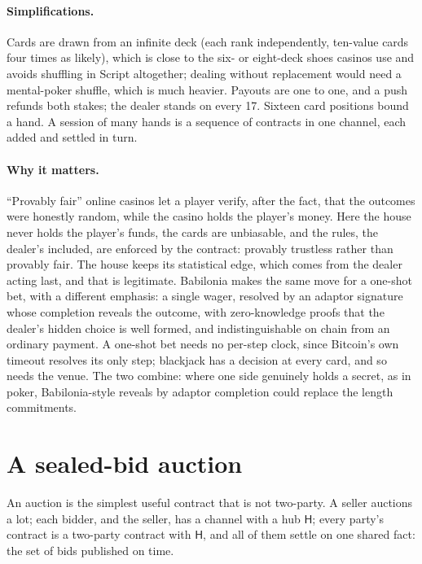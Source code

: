\documentclass[11pt]{article}
\newcommand{\Hub}{\mathsf{H}}
\begin{document}
\paragraph{Simplifications.} Cards are drawn from an infinite deck (each
rank independently, ten-value cards four times as likely), which is close
to the six- or eight-deck shoes casinos use and avoids shuffling in
Script altogether; dealing without replacement would need a mental-poker
shuffle, which is much heavier. Payouts are one to one, and a push
refunds both stakes; the dealer stands on every 17. Sixteen card
positions bound a hand. A session of many hands is a sequence of
contracts in one channel, each added and settled in turn.

\paragraph{Why it matters.} ``Provably fair'' online casinos let a
player verify, after the fact, that the outcomes were honestly random,
while the casino holds the player's money. Here the house never holds
the player's funds, the cards are unbiasable, and the rules, the
dealer's included, are enforced by the contract: provably trustless
rather than provably fair. The house keeps its statistical edge, which
comes from the dealer acting last, and that is legitimate. Babilonia
\cite{babilonia} makes the same move for a one-shot bet, with a
different emphasis: a single wager, resolved by an adaptor signature
whose completion reveals the outcome, with zero-knowledge proofs that
the dealer's hidden choice is well formed, and indistinguishable on
chain from an ordinary payment. A one-shot bet needs no per-step clock,
since Bitcoin's own timeout resolves its only step; blackjack has a
decision at every card, and so needs the venue. The two combine: where
one side genuinely holds a secret, as in poker, Babilonia-style reveals
by adaptor completion could replace the length commitments.

\section{A sealed-bid auction}
\label{sec:auction}

An auction is the simplest useful contract that is not two-party. A
seller auctions a lot; each bidder, and the seller, has a channel with a
hub $\Hub$; every party's contract is a two-party contract with $\Hub$,
and all of them settle on one shared fact: the set of bids published on
time.
\end{document}
